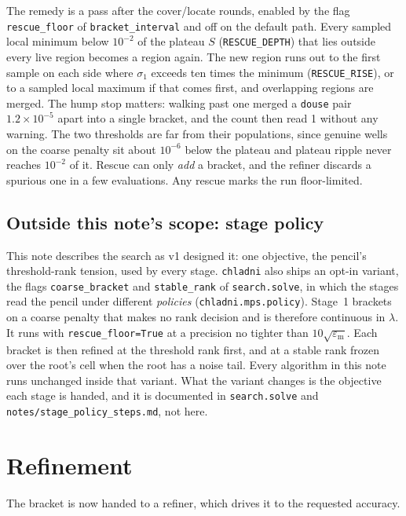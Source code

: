 \documentclass[11pt]{article}
\theoremstyle{definition}
\theoremstyle{remark}
\newcommand{\code}[1]{\texttt{#1}}
\newcommand{\lam}{\lambda}
\newcommand{\sig}{\sigma}
\begin{document}
The remedy is a pass after the cover/locate rounds, enabled by the flag \code{rescue\_floor} of \code{bracket\_interval} and off on the
default path. Every sampled local minimum below
$10^{-2}$ of the plateau $S$ (\code{RESCUE\_DEPTH}) that lies outside every live region becomes
a region again. The new region runs out to the first sample on each side where $\sig_1$
exceeds ten times the minimum (\code{RESCUE\_RISE}), or to a sampled local maximum if that
comes first, and overlapping regions are merged. The hump stop matters: walking past one
merged a \code{douse} pair $1.2\times10^{-5}$ apart into a single bracket, and the count then
read 1 without any warning. The two thresholds are far from their populations, since genuine
wells on the coarse penalty sit about $10^{-6}$ below the plateau and plateau ripple never
reaches $10^{-2}$ of it. Rescue can only \emph{add} a bracket, and the refiner discards a
spurious one in a few evaluations. Any rescue marks the run floor-limited.

\subsection{Outside this note's scope: stage policy}
\label{sec:policy}

This note describes the search as v1 designed it: one objective, the pencil's threshold-rank
tension, used by every stage. \code{chladni} also ships an opt-in variant, the flags
\code{coarse\_bracket} and \code{stable\_rank} of \code{search.solve}, in which the stages read
the pencil under different \emph{policies} (\code{chladni.mps.policy}). Stage~1 brackets on a
coarse penalty that makes no rank decision and is therefore continuous in $\lam$. It runs
with \code{rescue\_floor=True} at a precision no tighter than $10\sqrt{\varepsilon_{\mathrm m}}$. Each bracket is
then refined at the threshold rank first, and at a stable rank frozen over the root's cell when
the root has a noise tail. Every algorithm in this note runs unchanged inside that variant.
What the variant changes is the objective each stage is handed, and it is documented in
\code{search.solve} and \code{notes/stage\_policy\_steps.md}, not here.

\section{Refinement}
\label{sec:refine}

The bracket is now handed to a refiner, which drives it to the requested accuracy.
\end{document}
